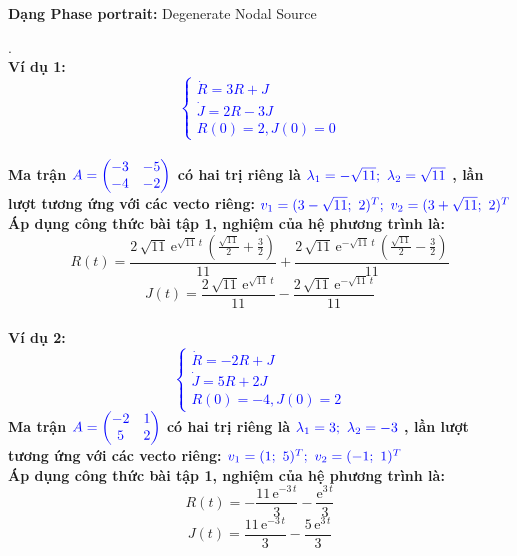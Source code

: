 \textbf{Dạng Phase portrait: } Degenerate Nodal Source
\pagebreak
\begin{tcbdoublebox}[title={6. Eager Beaver and Cautious Lover}]
\mdseries .\\
\bfseries Ví dụ 1: \\
\textcolor{blue}{$$\left\{\begin{matrix}
\dot{R} =  3R +J \\ 
\dot{J} =  2R-3J\\ 
R(0)= 2, J(0)=0
\end{matrix}\right.$$}\\
\mdseries Ma trận $\color{blue}A=\begin{pmatrix}
-3 & -5\\ 
-4 & -2
\end{pmatrix}$ có hai trị riêng là 
$\color{blue}\lambda_{1}=-\sqrt{11};\ \lambda_{2}=\sqrt{11}$
, lần lượt tương ứng với các vecto riêng:
$\color{blue}v_{1} = (3-\sqrt{11};\ 2)^{T};\ v_{2}=(3+\sqrt{11};\ 2)^{T}$\\Áp dụng công thức bài tập 1, nghiệm của hệ phương trình là:
$$R(t)=\frac{2\,\sqrt{11}\,{\mathrm{e}}^{\sqrt{11}\,t}\,\left(\frac{\sqrt{11}}{2}+\frac{3}{2}\right)}{11}+\frac{2\,\sqrt{11}\,{\mathrm{e}}^{-\sqrt{11}\,t}\,\left(\frac{\sqrt{11}}{2}-\frac{3}{2}\right)}{11}$$
$$J(t)=\frac{2\,\sqrt{11}\,{\mathrm{e}}^{\sqrt{11}\,t}}{11}-\frac{2\,\sqrt{11}\,{\mathrm{e}}^{-\sqrt{11}\,t}}{11}$$
\\
\bfseries Ví dụ 2:\\
\textcolor{blue}{$$\left\{\begin{matrix}
\dot{R} = -2R +J \\ 
\dot{J} =  5R +2J\\ 
R(0)= -4, J(0)=2
\end{matrix}\right.$$}
\mdseries Ma trận $\color{blue}A=\begin{pmatrix}
-2 & 1\\ 
5 & 2
\end{pmatrix}$ có hai trị riêng là 
$\color{blue}\lambda_{1}=3;\ \lambda_{2}=-3$
, lần lượt tương ứng với các vecto riêng:
$\color{blue}v_{1} = (1;\ 5)^{T};\ v_{2}=(-1;\ 1)^{T}$\\Áp dụng công thức bài tập 1, nghiệm của hệ phương trình là:
$$R(t)=-\frac{11\,{\mathrm{e}}^{-3\,t}}{3}-\frac{{\mathrm{e}}^{3\,t}}{3}$$
$$J(t)=\frac{11\,{\mathrm{e}}^{-3\,t}}{3}-\frac{5\,{\mathrm{e}}^{3\,t}}{3}$$

\end{tcbdoublebox}
